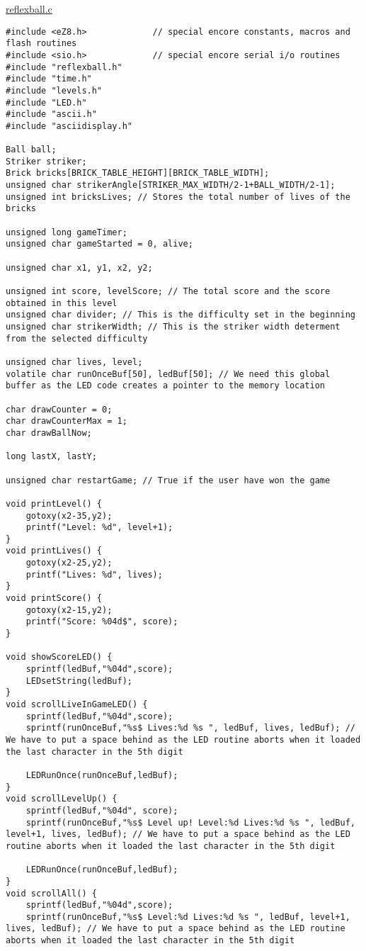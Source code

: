 \underline{reflexball.c}
\begin{lstlisting}
#include <eZ8.h>             // special encore constants, macros and flash routines
#include <sio.h>             // special encore serial i/o routines
#include "reflexball.h"
#include "time.h"
#include "levels.h"
#include "LED.h"
#include "ascii.h"
#include "asciidisplay.h"

Ball ball;
Striker striker;
Brick bricks[BRICK_TABLE_HEIGHT][BRICK_TABLE_WIDTH];
unsigned char strikerAngle[STRIKER_MAX_WIDTH/2-1+BALL_WIDTH/2-1];
unsigned int bricksLives; // Stores the total number of lives of the bricks

unsigned long gameTimer;
unsigned char gameStarted = 0, alive;

unsigned char x1, y1, x2, y2;

unsigned int score, levelScore; // The total score and the score obtained in this level
unsigned char divider; // This is the difficulty set in the beginning
unsigned char strikerWidth; // This is the striker width determent from the selected difficulty

unsigned char lives, level;
volatile char runOnceBuf[50], ledBuf[50]; // We need this global buffer as the LED code creates a pointer to the memory location

char drawCounter = 0;
char drawCounterMax = 1;
char drawBallNow;

long lastX, lastY;

unsigned char restartGame; // True if the user have won the game

void printLevel() {
	gotoxy(x2-35,y2);
	printf("Level: %d", level+1);
}
void printLives() {
	gotoxy(x2-25,y2);
	printf("Lives: %d", lives);	
}
void printScore() {
	gotoxy(x2-15,y2);
	printf("Score: %04d$", score);
}

void showScoreLED() {
	sprintf(ledBuf,"%04d",score);
	LEDsetString(ledBuf);
}
void scrollLiveInGameLED() {
	sprintf(ledBuf,"%04d",score);
	sprintf(runOnceBuf,"%s$ Lives:%d %s ", ledBuf, lives, ledBuf); // We have to put a space behind as the LED routine aborts when it loaded the last character in the 5th digit
	
	LEDRunOnce(runOnceBuf,ledBuf);
}
void scrollLevelUp() {
	sprintf(ledBuf,"%04d", score);
	sprintf(runOnceBuf,"%s$ Level up! Level:%d Lives:%d %s ", ledBuf, level+1, lives, ledBuf); // We have to put a space behind as the LED routine aborts when it loaded the last character in the 5th digit
	
	LEDRunOnce(runOnceBuf,ledBuf);
}
void scrollAll() {
	sprintf(ledBuf,"%04d",score);
	sprintf(runOnceBuf,"%s$ Level:%d Lives:%d %s ", ledBuf, level+1, lives, ledBuf); // We have to put a space behind as the LED routine aborts when it loaded the last character in the 5th digit
	

\end{lstlisting}
